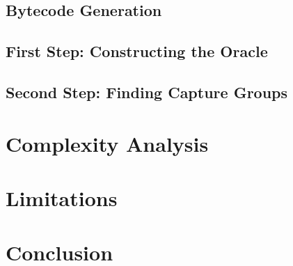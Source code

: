 \documentclass{article}
\begin{document}
\subsection{Bytecode Generation}

\subsection{First Step: Constructing the Oracle}

\subsection{Second Step: Finding Capture Groups}

\section{Complexity Analysis}

\section{Limitations}

\section{Conclusion}



\newpage

\end{document}
